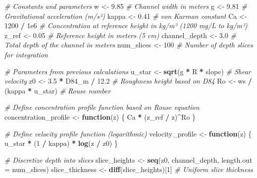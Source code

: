 \documentclass[
]{article}
\newenvironment{Shaded}{\begin{snugshade}}{\end{snugshade}}
\newcommand{\AttributeTok}[1]{\textcolor[rgb]{0.13,0.29,0.53}{#1}}
\newcommand{\CommentTok}[1]{\textcolor[rgb]{0.56,0.35,0.01}{\textit{#1}}}
\newcommand{\ControlFlowTok}[1]{\textcolor[rgb]{0.13,0.29,0.53}{\textbf{#1}}}
\newcommand{\DecValTok}[1]{\textcolor[rgb]{0.00,0.00,0.81}{#1}}
\newcommand{\FloatTok}[1]{\textcolor[rgb]{0.00,0.00,0.81}{#1}}
\newcommand{\FunctionTok}[1]{\textcolor[rgb]{0.13,0.29,0.53}{\textbf{#1}}}
\newcommand{\NormalTok}[1]{#1}
\newcommand{\OtherTok}[1]{\textcolor[rgb]{0.56,0.35,0.01}{#1}}
\newcommand{\SpecialCharTok}[1]{\textcolor[rgb]{0.81,0.36,0.00}{\textbf{#1}}}
\begin{document}
\begin{Shaded}
\begin{Highlighting}[]
\CommentTok{\# Constants and parameters}
\NormalTok{w }\OtherTok{\textless{}{-}} \FloatTok{9.85}                    \CommentTok{\# Channel width in meters }
\NormalTok{g }\OtherTok{\textless{}{-}} \FloatTok{9.81}                   \CommentTok{\# Gravitational acceleration (m/s²)}
\NormalTok{kappa }\OtherTok{\textless{}{-}} \FloatTok{0.41}               \CommentTok{\# von Karman constant}
\NormalTok{Ca }\OtherTok{\textless{}{-}} \DecValTok{1200} \SpecialCharTok{/} \FloatTok{1e6}            \CommentTok{\# Concentration at reference height in kg/m³ (1200 mg/L to kg/m³)}
\NormalTok{z\_ref }\OtherTok{\textless{}{-}} \FloatTok{0.05}               \CommentTok{\# Reference height in meters (5 cm)}
\NormalTok{channel\_depth }\OtherTok{\textless{}{-}} \FloatTok{3.0}        \CommentTok{\# Total depth of the channel in meters}
\NormalTok{num\_slices }\OtherTok{\textless{}{-}} \DecValTok{100}           \CommentTok{\# Number of depth slices for integration}

\CommentTok{\# Parameters from previous calculations}
\NormalTok{u\_star }\OtherTok{\textless{}{-}} \FunctionTok{sqrt}\NormalTok{(g }\SpecialCharTok{*}\NormalTok{ R }\SpecialCharTok{*}\NormalTok{ slope)  }\CommentTok{\# Shear velocity }
\NormalTok{z0 }\OtherTok{\textless{}{-}} \FloatTok{3.5} \SpecialCharTok{*}\NormalTok{ D84\_m }\SpecialCharTok{/} \FloatTok{12.2}       \CommentTok{\# Roughness height based on D84}
\NormalTok{Ro }\OtherTok{\textless{}{-}}\NormalTok{ ws }\SpecialCharTok{/}\NormalTok{ (kappa }\SpecialCharTok{*}\NormalTok{ u\_star)    }\CommentTok{\# Rouse number}

\CommentTok{\# Define concentration profile function based on Rouse equation}
\NormalTok{concentration\_profile }\OtherTok{\textless{}{-}} \ControlFlowTok{function}\NormalTok{(z) \{}
\NormalTok{  Ca }\SpecialCharTok{*}\NormalTok{ (z\_ref }\SpecialCharTok{/}\NormalTok{ z)}\SpecialCharTok{\^{}}\NormalTok{Ro}
\NormalTok{\}}

\CommentTok{\# Define velocity profile function (logarithmic)}
\NormalTok{velocity\_profile }\OtherTok{\textless{}{-}} \ControlFlowTok{function}\NormalTok{(z) \{}
\NormalTok{  u\_star }\SpecialCharTok{*}\NormalTok{ (}\DecValTok{1} \SpecialCharTok{/}\NormalTok{ kappa) }\SpecialCharTok{*} \FunctionTok{log}\NormalTok{(z }\SpecialCharTok{/}\NormalTok{ z0)}
\NormalTok{\}}

\CommentTok{\# Discretize depth into slices}
\NormalTok{slice\_heights }\OtherTok{\textless{}{-}} \FunctionTok{seq}\NormalTok{(z0, channel\_depth, }\AttributeTok{length.out =}\NormalTok{ num\_slices)}
\NormalTok{slice\_thickness }\OtherTok{\textless{}{-}} \FunctionTok{diff}\NormalTok{(slice\_heights)[}\DecValTok{1}\NormalTok{]  }\CommentTok{\# Uniform slice thickness}


\end{Highlighting}
\end{Shaded}
\end{document}

